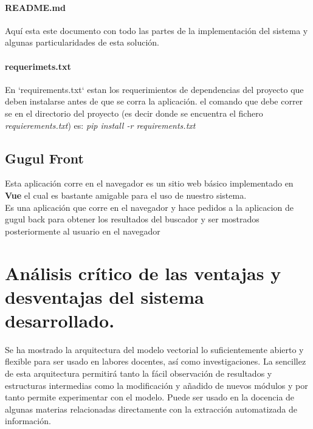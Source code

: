 \documentclass{llncs}
\begin{document}
	\paragraph{README.md} Aqu\'i  esta este documento con todo las partes de la implementaci\'on del sistema y algunas particularidades de esta soluci\'on.
	
	\paragraph{requerimets.txt}
	En `requirements.txt` estan los requerimientos de dependencias del proyecto que deben instalarse antes de que se corra la aplicaci\'on. el comando que debe correr se en el directorio del proyecto (es decir donde se encuentra el fichero \textit{requierements.txt}) es: \textit{pip install -r requirements.txt}
	
	
	
	
	
	
	
	\subsection{Gugul Front}
	
	
	\begin{flushleft}
		Esta aplicaci\'on corre en el navegador es un sitio web b\'asico implementado en \textbf{Vue} el cual es bastante amigable para el uso de nuestro sistema.
		\\
		Es una aplicaci\'on que corre en el navegador y hace pedidos a la aplicacion de gugul back para obtener los resultados del buscador y ser mostrados posteriormente al usuario en el navegador  
	\end{flushleft}
	
	\section{An\'alisis cr\'itico de las ventajas y desventajas del sistema desarrollado.}
	
	
	Se ha mostrado la arquitectura del modelo vectorial lo suficientemente abierto y flexible para ser usado en labores docentes, as\'i como investigaciones. La sencillez de esta arquitectura permitir\'a tanto la f\'acil observaci\'on de resultados y estructuras intermedias como la modificaci\'on y a\~nadido de nuevos m\'odulos y por tanto permite experimentar con el modelo. Puede ser usado en la docencia de algunas materias relacionadas directamente con la extracci\'on automatizada de informaci\'on.
	
\end{document}
